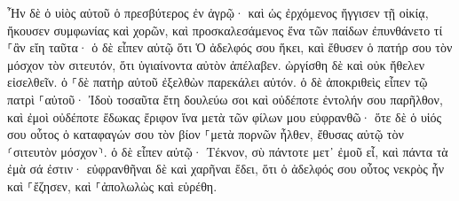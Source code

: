 \documentclass[twoside, 9pt]{extreport}
\begin{document}
Ἦν δὲ ὁ υἱὸς αὐτοῦ ὁ πρεσβύτερος ἐν ἀγρῷ· καὶ ὡς ἐρχόμενος ἤγγισεν τῇ οἰκίᾳ, ἤκουσεν συμφωνίας καὶ χορῶν, 
καὶ προσκαλεσάμενος ἕνα τῶν παίδων ἐπυνθάνετο τί ⸀ἂν εἴη ταῦτα· 
ὁ δὲ εἶπεν αὐτῷ ὅτι Ὁ ἀδελφός σου ἥκει, καὶ ἔθυσεν ὁ πατήρ σου τὸν μόσχον τὸν σιτευτόν, ὅτι ὑγιαίνοντα αὐτὸν ἀπέλαβεν. 
ὠργίσθη δὲ καὶ οὐκ ἤθελεν εἰσελθεῖν. ὁ ⸀δὲ πατὴρ αὐτοῦ ἐξελθὼν παρεκάλει αὐτόν. 
ὁ δὲ ἀποκριθεὶς εἶπεν τῷ πατρὶ ⸀αὐτοῦ· Ἰδοὺ τοσαῦτα ἔτη δουλεύω σοι καὶ οὐδέποτε ἐντολήν σου παρῆλθον, καὶ ἐμοὶ οὐδέποτε ἔδωκας ἔριφον ἵνα μετὰ τῶν φίλων μου εὐφρανθῶ· 
ὅτε δὲ ὁ υἱός σου οὗτος ὁ καταφαγών σου τὸν βίον ⸀μετὰ πορνῶν ἦλθεν, ἔθυσας αὐτῷ τὸν ⸂σιτευτὸν μόσχον⸃. 
ὁ δὲ εἶπεν αὐτῷ· Τέκνον, σὺ πάντοτε μετ᾽ ἐμοῦ εἶ, καὶ πάντα τὰ ἐμὰ σά ἐστιν· 
εὐφρανθῆναι δὲ καὶ χαρῆναι ἔδει, ὅτι ὁ ἀδελφός σου οὗτος νεκρὸς ἦν καὶ ⸀ἔζησεν, καὶ ⸀ἀπολωλὼς καὶ εὑρέθη. 
\end{document}
